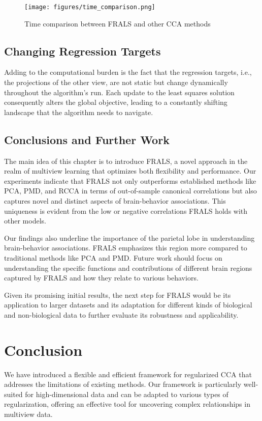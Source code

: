 \begin{figure}[h]
\centering
\texttt{[image: figures/time\_comparison.png]}
\caption{Time comparison between FRALS and other CCA methods}
\end{figure}

\subsection{Changing Regression Targets}\label{subsec:changing-regression-targets}
Adding to the computational burden is the fact that the regression targets, i.e., the projections of the other view, are not static but change dynamically throughout the algorithm's run.
Each update to the least squares solution consequently alters the global objective, leading to a constantly shifting landscape that the algorithm needs to navigate.





\subsection{Conclusions and Further Work}
The main idea of this chapter is to introduce FRALS, a novel approach in the realm of multiview learning that optimizes
both flexibility and performance.
Our experiments indicate that FRALS not only outperforms established methods like PCA, PMD, and RCCA in terms of out-of-sample canonical correlations but also captures novel and distinct aspects of brain-behavior associations.
This uniqueness is evident from the low or negative correlations FRALS holds with other models.

Our findings also underline the importance of the parietal lobe in understanding brain-behavior associations.
FRALS emphasizes this region more compared to traditional methods like PCA and PMD. Future work should focus on understanding the specific functions and contributions of different brain regions captured by FRALS and how they relate to various behaviors.

Given its promising initial results, the next step for FRALS would be its application to larger datasets and its adaptation for different kinds of biological and non-biological data to further evaluate its robustness and applicability.



\section{Conclusion}

We have introduced a flexible and efficient framework for regularized CCA that addresses the limitations of existing methods.
Our framework is particularly well-suited for high-dimensional data and can be adapted to various types of regularization, offering an effective tool for uncovering complex relationships in multiview data.







